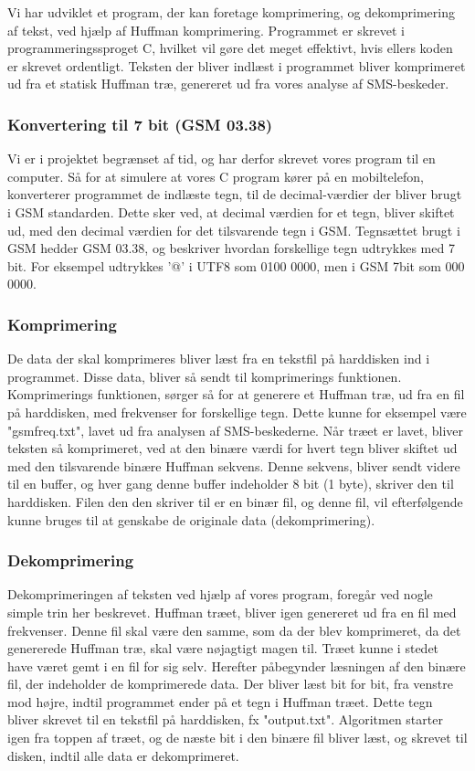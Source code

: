 Vi har udviklet et program, der kan foretage komprimering, og dekomprimering af tekst, ved hjælp af Huffman komprimering. Programmet er skrevet i programmeringssproget C, hvilket vil gøre det meget effektivt, hvis ellers koden er skrevet ordentligt.
Teksten der bliver indlæst i programmet bliver komprimeret ud fra et statisk Huffman træ, genereret ud fra vores analyse af SMS-beskeder.


\subsubsection{Konvertering til 7 bit (GSM 03.38)}
Vi er i projektet begrænset af tid, og har derfor skrevet vores program til en computer. Så for at simulere at vores C program kører på en mobiltelefon, konverterer programmet de indlæste tegn, til de decimal-værdier der bliver brugt i GSM standarden. Dette sker ved, at decimal værdien for et tegn, bliver skiftet ud, med den decimal værdien for det tilsvarende tegn i GSM. Tegnsættet brugt i GSM hedder GSM 03.38, og beskriver hvordan forskellige tegn udtrykkes med 7 bit. For eksempel udtrykkes '@' i UTF8 som 0100 0000, men i GSM 7bit som 000 0000.


\subsubsection{Komprimering}

De data der skal komprimeres bliver læst fra en tekstfil på harddisken ind i programmet. Disse data, bliver så sendt til komprimerings funktionen. Komprimerings funktionen, sørger så for at generere et Huffman træ, ud fra en fil på harddisken, med frekvenser for forskellige tegn. Dette kunne for eksempel være "gsmfreq.txt", lavet ud fra analysen af SMS-beskederne.
Når træet er lavet, bliver teksten så komprimeret, ved at den binære værdi for hvert tegn bliver skiftet ud med den tilsvarende binære Huffman sekvens. Denne sekvens, bliver sendt videre til en buffer, og hver gang denne buffer indeholder 8 bit (1 byte), skriver den til harddisken. Filen den den skriver til er en binær fil, og denne fil, vil efterfølgende kunne bruges til at genskabe de originale data (dekomprimering).

\subsubsection{Dekomprimering}

Dekomprimeringen af teksten ved hjælp af vores program, foregår ved nogle simple trin her beskrevet. Huffman træet, bliver igen genereret ud fra en fil med frekvenser. Denne fil skal være den samme, som da der blev komprimeret, da det genererede Huffman træ, skal være nøjagtigt magen til. Træet kunne i stedet have været gemt i en fil for sig selv.
Herefter påbegynder læsningen af den binære fil, der indeholder de komprimerede data. Der bliver læst bit for bit, fra venstre mod højre, indtil programmet ender på et tegn i Huffman træet. Dette tegn bliver skrevet til en tekstfil på harddisken, fx "output.txt". Algoritmen starter igen fra toppen af træet, og de næste bit i den binære fil bliver læst, og skrevet til disken, indtil alle data er dekomprimeret.

